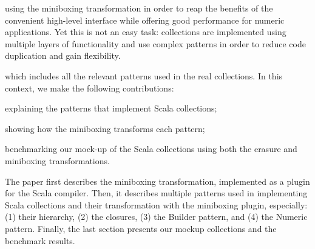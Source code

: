  using the miniboxing transformation in order to reap the benefits of the convenient high-level interface while offering good performance for numeric applications. Yet this is not an easy task: collections are implemented using multiple layers of functionality and use complex patterns in order to reduce code duplication and gain flexibility.

 which includes all the relevant patterns used in the real collections. In this context, we make the following contributions:

\begin{packed_item}
\item explaining the patterns that implement Scala collections;
\item showing how the miniboxing transforms each pattern;
\item benchmarking our mock-up of the Scala collections using both the erasure and miniboxing transformations.
\end{packed_item}

The paper first describes the miniboxing transformation, implemented as a plugin for the Scala compiler. Then, it describes multiple patterns used in implementing Scala collections and their transformation with the miniboxing plugin, especially: (1) their hierarchy, (2) the closures, (3) the Builder pattern, and (4) the Numeric pattern. Finally, the last section presents our mockup collections and the benchmark results.